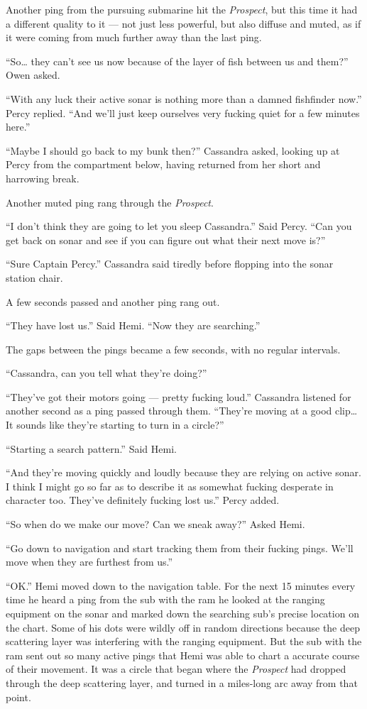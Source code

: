 \documentclass[]{scrbook}
\begin{document}
Another ping from the pursuing submarine hit the \emph{Prospect}, but
this time it had a different quality to it --- not just less powerful,
but also diffuse and muted, as if it were coming from much further away
than the last ping.

``So\ldots{} they can't see us now because of the layer of fish between
us and them?'' Owen asked.

``With any luck their active sonar is nothing more than a damned
fishfinder now.'' Percy replied. ``And we'll just keep ourselves very
fucking quiet for a few minutes here.''

``Maybe I should go back to my bunk then?'' Cassandra asked, looking up
at Percy from the compartment below, having returned from her short and
harrowing break.

Another muted ping rang through the \emph{Prospect}.

``I don't think they are going to let you sleep Cassandra.'' Said Percy.
``Can you get back on sonar and see if you can figure out what their
next move is?''

``Sure Captain Percy.'' Cassandra said tiredly before flopping into the
sonar station chair.

A few seconds passed and another ping rang out.

``They have lost us.'' Said Hemi. ``Now they are searching.''

The gaps between the pings became a few seconds, with no regular
intervals.

``Cassandra, can you tell what they're doing?''

``They've got their motors going --- pretty fucking loud.'' Cassandra
listened for another second as a ping passed through them. ``They're
moving at a good clip\ldots{} It sounds like they're starting to turn in
a circle?''

``Starting a search pattern.'' Said Hemi.

``And they're moving quickly and loudly because they are relying on
active sonar. I think I might go so far as to describe it as somewhat
fucking desperate in character too. They've definitely fucking lost
us.'' Percy added.

``So when do we make our move? Can we sneak away?'' Asked Hemi.

``Go down to navigation and start tracking them from their fucking
pings. We'll move when they are furthest from us.''

``OK.'' Hemi moved down to the navigation table. For the next 15 minutes
every time he heard a ping from the sub with the ram he looked at the
ranging equipment on the sonar and marked down the searching sub's
precise location on the chart. Some of his dots were wildly off in
random directions because the deep scattering layer was interfering with
the ranging equipment. But the sub with the ram sent out so many active
pings that Hemi was able to chart a accurate course of their movement.
It was a circle that began where the \emph{Prospect} had dropped through
the deep scattering layer, and turned in a miles-long arc away from that
point.
\end{document}
